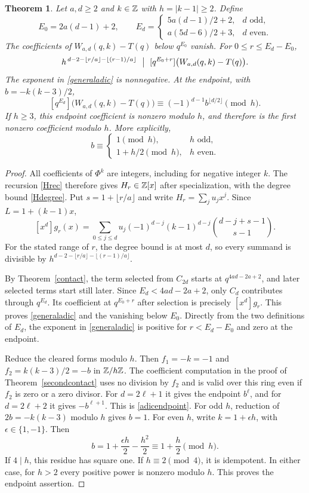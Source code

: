 \documentclass[11pt]{amsart}
\newtheorem{theorem}{Theorem}[section]
\theoremstyle{definition}
\theoremstyle{remark}
\numberwithin{equation}{section}
\begin{document}
\begin{theorem}\label{adic}
Let $a,d\ge2$ and $k\in\mathbb Z$ with $h=|k-1|\ge2$. Define
\[
 E_0=2a(d-1)+2,\qquad
 E_d=\begin{cases}
 5a(d-1)/2+2,&d\text{ odd},\\
 a(5d-6)/2+3,&d\text{ even}.
 \end{cases}
\]
The coefficients of $W_{a,d}(q,k)-T(q)$ below $q^{E_0}$ vanish. For $0\le r\le E_d-E_0$,
\begin{equation}\label{generaladic}
 h^{\,d-2-\lfloor r/a\rfloor-\lfloor(r-1)/a\rfloor}
 \ \bigm|\ [q^{E_0+r}]\bigl(W_{a,d}(q,k)-T(q)\bigr).
\end{equation}
The exponent in \eqref{generaladic} is nonnegative. At the endpoint, with $b=-k(k-3)/2$,
\begin{equation}\label{adicendpoint}
 [q^{E_d}]\bigl(W_{a,d}(q,k)-T(q)\bigr)
 \equiv(-1)^{d-1}b^{\lfloor d/2\rfloor}\pmod h.
\end{equation}
If $h\ge3$, this endpoint coefficient is nonzero modulo $h$, and therefore
is the first nonzero coefficient modulo $h$. More explicitly,
\[
 b\equiv
 \begin{cases}
 1\pmod h,&h\text{ odd},\\
 1+h/2\pmod h,&h\text{ even}.
 \end{cases}
\]
\end{theorem}
\begin{proof}
All coefficients of $\Phi^k$ are integers, including for negative integer $k$. The recursion \eqref{Hrec} therefore gives $H_r\in\mathbb Z[x]$ after specialization, with the degree bound \eqref{Hdegree}. Put $s=1+\lfloor r/a\rfloor$ and write $H_r=\sum_j u_jx^j$. Since $L=1+(k-1)x$,
\[
 [x^d]g_r(x)=\sum_{0\le j\le d}
 u_j(-1)^{d-j}(k-1)^{d-j}
       \binom{d-j+s-1}{s-1}.
\]
For the stated range of $r$, the degree bound is at most $d$, so every summand is divisible by
$h^{d-2-\lfloor r/a\rfloor-\lfloor(r-1)/a\rfloor}$.

By Theorem~\ref{contact}, the term selected from $C_{2d}$ starts at $q^{4ad-2a+2}$, and later selected terms start still later. Since $E_d<4ad-2a+2$, only $C_d$ contributes through $q^{E_d}$. Its coefficient at $q^{E_0+r}$ after selection is precisely $[x^d]g_r$. This proves \eqref{generaladic} and the vanishing below $E_0$. Directly from the two definitions of $E_d$, the exponent in \eqref{generaladic} is positive for $r<E_d-E_0$ and zero at the endpoint.

Reduce the cleared forms modulo $h$. Then $f_1=-k=-1$ and $f_2=k(k-3)/2=-b$ in $\mathbb Z/h\mathbb Z$. The coefficient computation in the proof of Theorem~\ref{secondcontact} uses no division by $f_2$ and is valid over this ring even if $f_2$ is zero or a zero divisor. For $d=2\ell+1$ it gives the endpoint $b^\ell$, and for $d=2\ell+2$ it gives $-b^{\ell+1}$. This is \eqref{adicendpoint}. For odd $h$, reduction of $2b=-k(k-3)$ modulo $h$ gives $b=1$.
For even $h$, write $k=1+\epsilon h$, with $\epsilon\in\{1,-1\}$. Then
\[
 b=1+\frac{\epsilon h}{2}-\frac{h^2}{2}
   \equiv1+\frac h2\pmod h.
\]
If $4\mid h$, this residue has square one. If $h\equiv2\pmod4$, it is
idempotent. In either case, for $h>2$ every positive power is nonzero
modulo $h$. This proves the endpoint assertion.
\end{proof}
\end{document}
